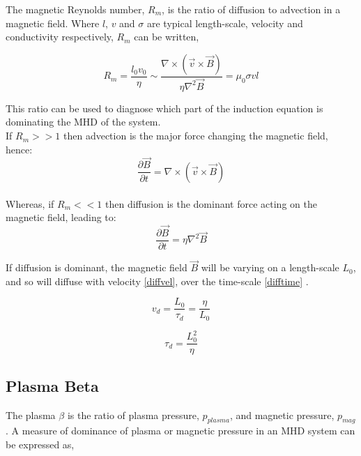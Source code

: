 The magnetic Reynolds number, $R_m$, is the ratio of diffusion to advection in a magnetic field. Where $l$, $v$ and $\sigma$ are typical length-scale, velocity and conductivity respectively, $R_m$ can be written,  

\begin{equation}\label{reynolds}
R_{m} = \frac{l_{0}v_{0}}{\eta} \sim \frac{\nabla\times(\vec{v}\times\vec{B})}{\eta\nabla^{2}\vec{B}}=\mu_{0}\sigma v l
\end{equation}

This ratio can be used to diagnose which part of the induction equation is dominating the MHD of the system. \\

If $R_m >> 1$ then advection is the major force changing the magnetic field, hence:
\begin{equation}\label{r>>1}
\frac{\partial \vec{B}}{\partial t}=\nabla\times(\vec{v}\times\vec{B})
\end{equation}
\\

Whereas, if $R_m << 1$ then diffusion is the dominant force acting on the magnetic field, leading to:
\begin{equation}\label{r<<1}
\frac{\partial \vec{B}}{\partial t}=\eta\nabla^{2}\vec{B}
\end{equation}

If diffusion is dominant, the magnetic field $\vec{B}$ will be varying on a length-scale $L_0$, and so will diffuse with velocity \ref{diffvel}, over the time-scale \ref{difftime} \citep{2003dysu.book.....D}.

\begin{equation}\label{diffvel}
v_d=\frac{L_0}{\tau_d} = \frac{\eta}{L_0}
\end{equation}


\begin{equation}\label{difftime}
\tau_d = \frac{L_{0}^{2}}{\eta}
\end{equation}



%
\subsection{Plasma Beta}
The plasma $\beta$ is the ratio of plasma pressure, $p_{plasma}$, and magnetic pressure, $p_{mag}$. A measure of dominance of plasma or magnetic pressure in an MHD system can be expressed as, 

